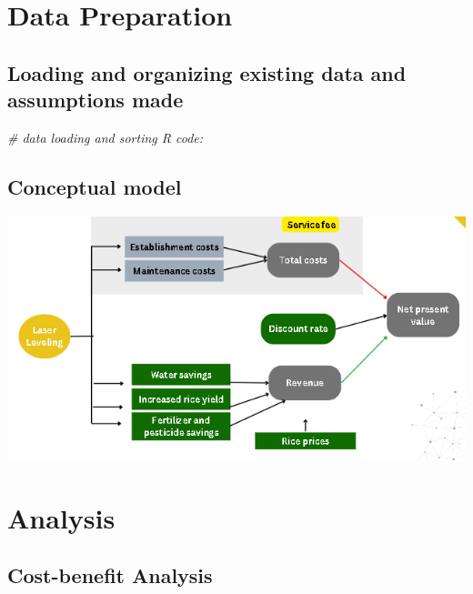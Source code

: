 \documentclass[
]{article}
\newenvironment{Shaded}{\begin{snugshade}}{\end{snugshade}}
\newcommand{\CommentTok}[1]{\textcolor[rgb]{0.56,0.35,0.01}{\textit{#1}}}
\begin{document}
\hypertarget{data-preparation}{%
\section{Data Preparation}\label{data-preparation}}

\hypertarget{loading-and-organizing-existing-data-and-assumptions-made}{%
\subsection{Loading and organizing existing data and assumptions
made}\label{loading-and-organizing-existing-data-and-assumptions-made}}

\begin{Shaded}
\begin{Highlighting}[]
\CommentTok{\# data loading and sorting R code:}
\end{Highlighting}
\end{Shaded}

\hypertarget{conceptual-model}{%
\subsection{Conceptual model}\label{conceptual-model}}

\includegraphics{images/conceptual_model-01.png}

\hypertarget{analysis}{%
\section{Analysis}\label{analysis}}

\hypertarget{cost-benefit-analysis}{%
\subsection{Cost-benefit Analysis}\label{cost-benefit-analysis}}
\end{document}
